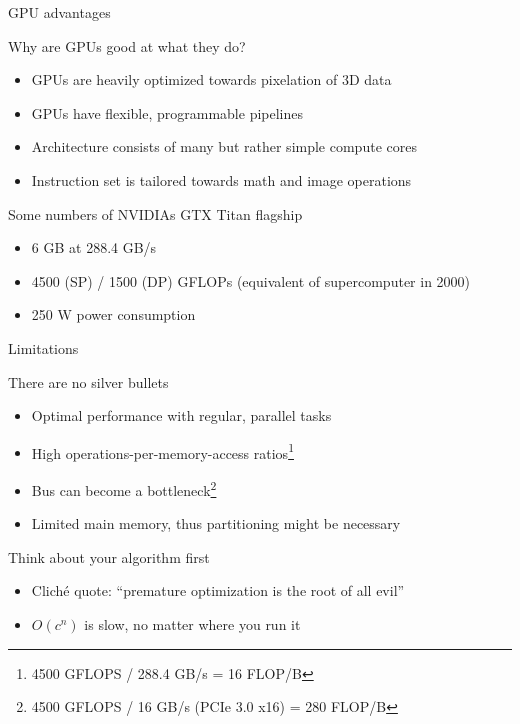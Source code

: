 \documentclass[18pt]{beamer}
\begin{document}
\begin{frame}{GPU advantages}
  \begin{block}{Why are GPUs good at what they do?}
    \begin{itemize}
      \item GPUs are heavily optimized towards pixelation of 3D data
      \item GPUs have flexible, programmable pipelines
      \item Architecture consists of many but rather simple compute cores
      \item Instruction set is tailored towards math and image operations
    \end{itemize}
  \end{block}

  \begin{block}{Some numbers of NVIDIAs GTX Titan flagship}
    \begin{itemize}
      \item 6 GB at 288.4 GB/s
      \item 4500 (SP) / 1500 (DP) GFLOPs (equivalent of supercomputer in 2000)
      \item 250 W power consumption
    \end{itemize}
  \end{block}
\end{frame}
\begin{frame}{Limitations}
  \begin{block}{There are no silver bullets}
    \begin{itemize}
      \item Optimal performance with regular, parallel tasks
      \item High operations-per-memory-access ratios\footnote{4500 GFLOPS / 288.4 GB/s
          = 16 FLOP/B}
        \item Bus can become a bottleneck\footnote{4500 GFLOPS / 16 GB/s
            (PCIe 3.0 x16) = 280 FLOP/B}
      \item Limited main memory, thus partitioning might be necessary
    \end{itemize}
  \end{block}

  \begin{block}{Think about your algorithm first}
    \begin{itemize}
      \item Cliché quote: \enquote{premature optimization is the root of all
          evil}
      \item $O(c^n)$ is slow, no matter where you run it
    \end{itemize}
  \end{block}
\end{frame}
\end{document}
